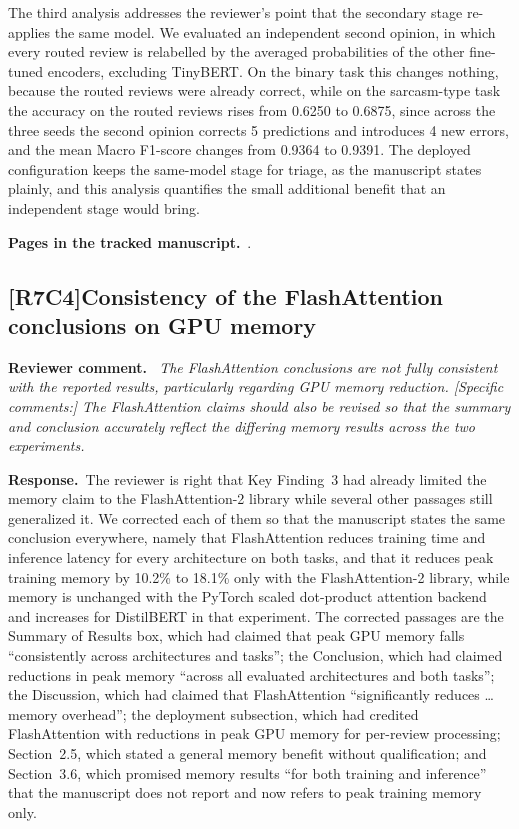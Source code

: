 \documentclass[11pt,a4paper]{article}
\newcommand{\comment}[3]{\subsection*{\textcolor{#1}{[#2]}\enspace #3}}
\newenvironment{reviewercomment}{\par\noindent\textbf{Reviewer comment.}\itshape\ }{\par}
\newcommand{\response}{\par\noindent\textbf{Response.}\ }
\newcommand{\where}[1]{\par\noindent\textbf{Pages in the tracked manuscript.}\ \rvpages[M-]{#1}.}
\begin{document}
The third analysis addresses the reviewer's point that the secondary stage re-applies the same model. We evaluated an independent second opinion, in which every routed review is relabelled by the averaged probabilities of the other fine-tuned encoders, excluding TinyBERT. On the binary task this changes nothing, because the routed reviews were already correct, while on the sarcasm-type task the accuracy on the routed reviews rises from 0.6250 to 0.6875, since across the three seeds the second opinion corrects 5 predictions and introduces 4 new errors, and the mean Macro F1-score changes from 0.9364 to 0.9391. The deployed configuration keeps the same-model stage for triage, as the manuscript states plainly, and this analysis quantifies the small additional benefit that an independent stage would bring.

\where{R7C3}

\comment{rvSeven}{R7C4}{Consistency of the FlashAttention conclusions on GPU memory}
\begin{reviewercomment}
The FlashAttention conclusions are not fully consistent with the reported results, particularly regarding GPU memory reduction. [Specific comments:] The FlashAttention claims should also be revised so that the summary and conclusion accurately reflect the differing memory results across the two experiments.
\end{reviewercomment}
\response The reviewer is right that Key Finding~3 had already limited the memory claim to the FlashAttention-2 library while several other passages still generalized it. We corrected each of them so that the manuscript states the same conclusion everywhere, namely that FlashAttention reduces training time and inference latency for every architecture on both tasks, and that it reduces peak training memory by 10.2\% to 18.1\% only with the FlashAttention-2 library, while memory is unchanged with the PyTorch scaled dot-product attention backend and increases for DistilBERT in that experiment. The corrected passages are the Summary of Results box, which had claimed that peak GPU memory falls ``consistently across architectures and tasks''; the Conclusion, which had claimed reductions in peak memory ``across all evaluated architectures and both tasks''; the Discussion, which had claimed that FlashAttention ``significantly reduces \ldots memory overhead''; the deployment subsection, which had credited FlashAttention with reductions in peak GPU memory for per-review processing; Section~2.5, which stated a general memory benefit without qualification; and Section~3.6, which promised memory results ``for both training and inference'' that the manuscript does not report and now refers to peak training memory only.
\end{document}
